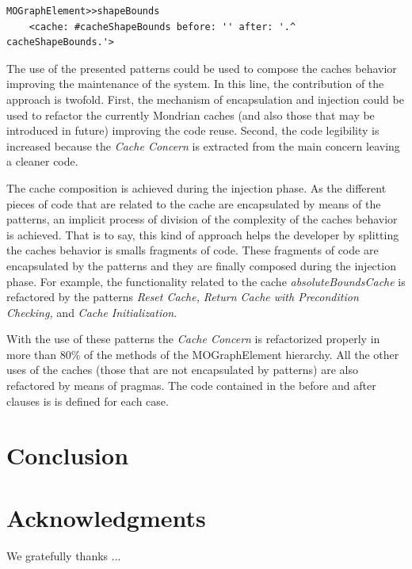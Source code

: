\documentclass[runningheads]{llncs}
\newcommand{\seclabel}[1]{\label{sec:#1}}
\begin{document}
\begin{lstlisting} 
MOGraphElement>>shapeBounds
	<cache: #cacheShapeBounds before: '' after: '.^  cacheShapeBounds.'> 
\end{lstlisting}

The use of the presented patterns could be used to compose the caches
behavior improving the maintenance of the system. In this line, the
contribution of the approach is twofold. First, the mechanism of encapsulation
and injection could be used to refactor the currently Mondrian caches
(and also those that may be introduced in future) improving the code
reuse. Second, the code legibility is increased because the \emph{Cache
Concern} is extracted from the main concern leaving a cleaner code. 

The cache composition is achieved during the injection phase. As the
different pieces of code that are related to the cache are encapsulated
by means of the patterns, an implicit process of division of the complexity
of the caches behavior is achieved. That is to say, this kind of approach
helps the developer by splitting the caches behavior is smalls fragments
of code. These fragments of code are encapsulated by the patterns
and they are finally composed during the injection phase. For example,
the functionality related to the cache \emph{absoluteBoundsCache}
is refactored by the patterns \emph{Reset Cache,} \emph{Return Cache
with Precondition Checking,} and \emph{Cache Initialization}. 

With the use of these patterns the \emph{Cache Concern} is refactorized
properly in more than 80\% of the methods of the MOGraphElement hierarchy.
All the other uses of the caches (those that are not encapsulated
by patterns) are also refactored by means of pragmas. The code contained
in the before and after clauses is is defined for each case.

\section{Conclusion}\seclabel{conclusion}



\section*{Acknowledgments}

\small We gratefully thanks ...



\end{document}

